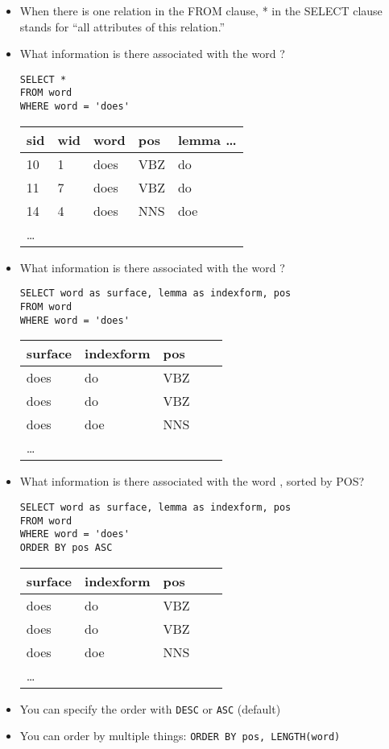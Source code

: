 \documentclass[a4paper,landscape,headrule,footrule,xetex]{foils}
\begin{document}

\begin{itemize}
\item When there is one relation in the FROM clause, * in the SELECT clause stands for “all attributes of this relation.”
\item What information is there associated with the word ?
\begin{verbatim}
SELECT *
FROM word
WHERE word = 'does'
\end{verbatim}
  \begin{tabular}{lllll}
   \textbf{sid} & \textbf{wid} &  \textbf{word} & \textbf{pos} & \textbf{lemma} \ldots \\ \hline
    10 & 1 & does & VBZ & do \\
    11 & 7 & does & VBZ & do \\
    14 & 4 & does & NNS & doe \\
    \ldots
  \end{tabular}
\end{itemize}


\begin{itemize}
\item What information is there associated with the word ?
\begin{verbatim}
SELECT word as surface, lemma as indexform, pos
FROM word
WHERE word = 'does'
\end{verbatim}
  \begin{tabular}{lllll}
    \textbf{surface}  & \textbf{indexform}  &  \textbf{pos} \\ \hline
    does & do  & VBZ \\
    does & do  & VBZ \\
    does & doe & NNS \\
    \ldots
  \end{tabular}
\end{itemize}


\begin{itemize}\addtolength{\itemsep}{-1ex}
\item What information is there associated with the word , sorted by POS?
\begin{verbatim}
SELECT word as surface, lemma as indexform, pos
FROM word
WHERE word = 'does'
ORDER BY pos ASC
\end{verbatim}
  \begin{tabular}{lllll}
    \textbf{surface}  & \textbf{indexform}  &  \textbf{pos} \\ \hline
    does & do  & VBZ \\
    does & do  & VBZ \\
    does & doe & NNS \\
    \ldots
  \end{tabular}
\item You can specify the order with \texttt{DESC} or \texttt{ASC} (default)
\item You can order by multiple things: \texttt{ORDER BY pos, LENGTH(word)}
\end{itemize}
\end{document}
